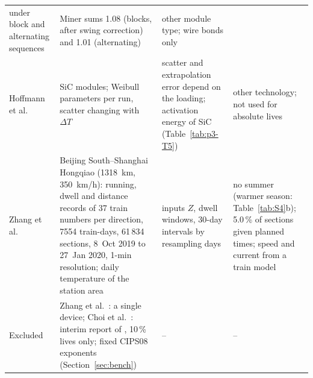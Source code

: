 \begin{table}[htbp]
\begin{tabularx}{\textwidth}{@{}>{\raggedright\arraybackslash}p{2.6cm}>{\raggedright\arraybackslash}X
>{\raggedright\arraybackslash}p{4.1cm}>{\raggedright\arraybackslash}p{4.1cm}@{}}
12 under block and alternating sequences & Miner sums 1.08 (blocks, after swing correction) and 1.01 (alternating) &
other module type; wire bonds only \\
\addlinespace
Hoffmann et al.\ \cite{hoffmann2020,hoffmann2023} & SiC modules; Weibull parameters per run, scatter changing with
$\Delta T$ & scatter and extrapolation error depend on the loading; activation energy of SiC (Table~\ref{tab:p3-T5}) &
other technology; not used for absolute lives \\
\addlinespace
Zhang et al.\ \cite{zhang2022hsr} & Beijing South--Shanghai Hongqiao (1318~km, 350~km/h): running, dwell and distance
records of 37 train numbers per direction, 7554 train-days, 61\,834 sections, 8~Oct 2019 to 27~Jan 2020, 1-min
resolution; daily temperature of the station area & inputs $Z$, dwell windows, 30-day intervals by resampling days &
no summer (warmer season: Table~\ref{tab:S4}b); 5.0\,\% of sections given planned times; speed and current from a
train model \\
\addlinespace
Excluded & Zhang et al.\ \cite{zhang2021data}: a single device; Choi et al.\ \cite{choi2016mr}: interim report of
\cite{choi2017}, 10\,\% lives only; fixed CIPS08 exponents \cite{bayerer2008} (Section~\ref{sec:bench}) & -- & -- \\
\bottomrule
\end{tabularx}
\end{table}
